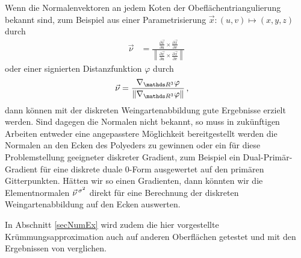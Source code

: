    \begin{fazit}
      Wenn die Normalenvektoren an jedem Koten der Obeflächentriangulierung bekannt sind, zum Beispiel aus einer Parametrisierung
      \( \vec{x}: \left( u,v \right) \mapsto \left( x,y,z \right)\) durch
      \begin{align}
        \vec{\nu} &= \frac{\frac{\partial\vec{x}}{\partial u} \times \frac{\partial\vec{x}}{\partial v}}
                             {\left\| \frac{\partial\vec{x}}{\partial u} \times \frac{\partial\vec{x}}{\partial v} \right\|}
      \end{align}
      oder einer signierten Distanzfunktion \( \varphi \) durch
      \begin{align}
        \label{eqNormalsFromSignDist}
        \vec{\nu} &= \frac{\nabla_{\R^{3}}\varphi}{\left\| \nabla_{\R^{3}}\varphi \right\|} \formkomma
      \end{align}
      dann können mit der diskreten Weingartenabbildung gute Ergebnisse erzielt werden.
      Sind dagegen die Normalen nicht bekannt, so muss in zukünftigen Arbeiten entweder eine angepasstere Möglichkeit bereitgestellt
      werden die Normalen an den Ecken des Polyeders zu gewinnen oder ein für diese Problemstellung geeigneter diskreter Gradient,
      zum Beispiel ein Dual-Primär-Gradient für eine diskrete duale \( 0 \)-Form ausgewertet auf den primären Gitterpunkten.
      Hätten wir so einen Gradienten, dann könnten wir die Elementnormalen \( \vec{\nu}^{\,\sigma^{2}} \) direkt 
      für eine
      Berechnung der diskreten Weingartenabbildung auf den Ecken auswerten.

      In Abschnitt \ref{secNumEx} wird zudem die hier vorgestellte Krümmungsapproximation auch auf anderen Oberflächen getestet und mit den
      Ergebnissen von \cite{heine} verglichen.
    \end{fazit}



